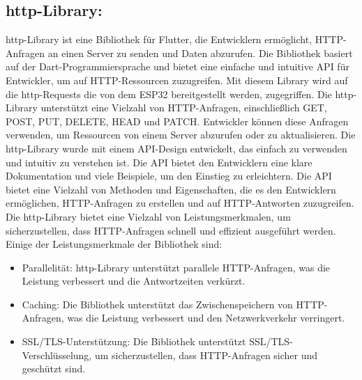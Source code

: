 \subsection*{http-Library:}
http-Library ist eine Bibliothek für Flutter, die Entwicklern ermöglicht, HTTP-Anfragen an einen Server zu senden und Daten abzurufen. 
Die Bibliothek basiert auf der Dart-Programmiersprache und bietet eine einfache und intuitive API für Entwickler, um auf HTTP-Ressourcen zuzugreifen. 
Mit diesem Library wird auf die http-Requests die von dem ESP32 bereitgestellt werden, zugegriffen. 
Die http-Library unterstützt eine Vielzahl von HTTP-Anfragen, einschließlich GET, POST, PUT, DELETE, HEAD und PATCH. 
Entwickler können diese Anfragen verwenden, um Ressourcen von einem Server abzurufen oder zu aktualisieren. Die http-Library wurde mit einem API-Design entwickelt, das einfach zu verwenden und intuitiv zu verstehen ist. 
Die API bietet den Entwicklern eine klare Dokumentation und viele Beispiele, um den Einstieg zu erleichtern. Die API bietet eine Vielzahl von Methoden und Eigenschaften, die es den Entwicklern ermöglichen, HTTP-Anfragen zu erstellen und auf HTTP-Antworten zuzugreifen. 
Die http-Library bietet eine Vielzahl von Leistungsmerkmalen, um sicherzustellen, dass HTTP-Anfragen schnell und effizient ausgeführt werden. 
Einige der Leistungsmerkmale der Bibliothek sind: 

\begin{itemize}
    \item Parallelität: http-Library unterstützt parallele HTTP-Anfragen, was die Leistung verbessert und die Antwortzeiten verkürzt.
    \item Caching: Die Bibliothek unterstützt das Zwischenspeichern von HTTP-Anfragen, was die Leistung verbessert und den Netzwerkverkehr verringert.
    \item SSL/TLS-Unterstützung: Die Bibliothek unterstützt SSL/TLS-Verschlüsselung, um sicherzustellen, dass HTTP-Anfragen sicher und geschützt sind.
\end{itemize}

